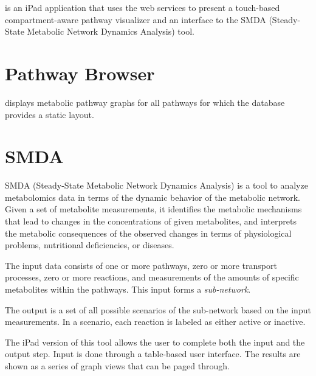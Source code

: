 \mawapp is an iPad application that uses the \pathcasemaw web services to
present a touch-based compartment-aware pathway visualizer and an interface to
the SMDA (Steady-State Metabolic Network Dynamics Analysis) tool.

\section{Pathway Browser}

\mawapp displays metabolic pathway graphs for all pathways for which the
\pathcasemaw database provides a static layout.





\section{SMDA}
\label{sect:smda}

SMDA (Steady-State Metabolic Network Dynamics Analysis) is a tool to analyze
metabolomics data in terms of the dynamic behavior of the metabolic network.
Given a set of metabolite measurements, it identifies the metabolic mechanisms
that lead to changes in the concentrations of given metabolites, and interprets
the metabolic consequences of the observed changes in terms of physiological
problems, nutritional deficiencies, or diseases.

The input data consists of one or more pathways, zero or more transport
processes, zero or more reactions, and measurements of the amounts of specific
metabolites within the pathways. This input forms a \emph{sub-network}.

The output is a set of all possible scenarios of the sub-network based on the
input measurements. In a scenario, each reaction is labeled as either active or
inactive.

The iPad version of this tool allows the user to complete both the input and
the output step. Input is done through a table-based user interface. The results
are shown as a series of graph views that can be paged through.








